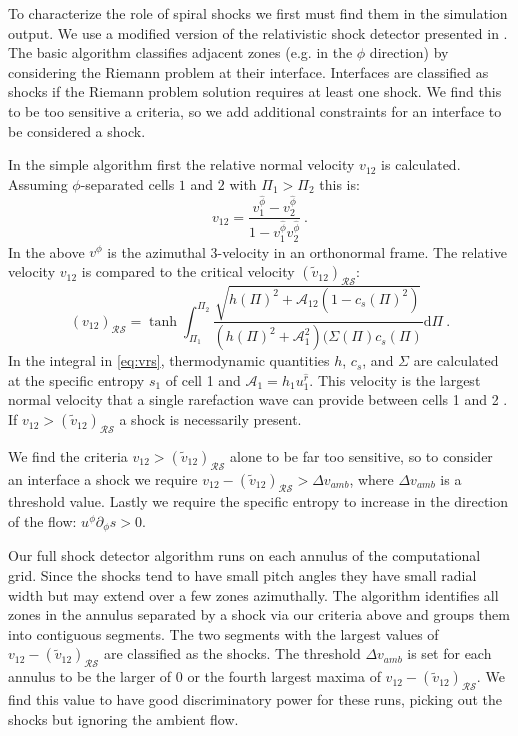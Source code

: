 \documentclass{emulateapj}
\newcommand{\Sig}{\Sigma}
\newcommand{\dd}{\mbox{d}}
\begin{document}
To characterize the role of spiral shocks we first must find them in the simulation output.  We use a modified version of the relativistic shock detector presented in \citep{Zanotti10}.  The basic algorithm classifies adjacent zones (e.g. in the $\phi$ direction) by considering the Riemann problem at their interface.  Interfaces are classified as shocks if the Riemann problem solution requires at least one shock.  We find this to be too sensitive a criteria, so we add additional constraints for an interface to be considered a shock.

In the simple algorithm first the relative normal velocity $v_{12}$ is calculated.  Assuming $\phi$-separated cells $1$ and $2$ with $\Pi_1 > \Pi_2$ this is:
\begin{equation}
	v_{12} = \frac{v^{\hat{\phi}}_1 - v^{\hat{\phi}}_2}{1 - v^{\hat{\phi}}_1 v^{\hat{\phi}}_2} \ . \label{eq:vrel}
\end{equation}
In the above $v^{\hat{\phi}}$ is the azimuthal 3-velocity in an orthonormal frame. The relative velocity $v_{12}$ is compared to the critical velocity $(\tilde{v}_{12})_{\mathcal{R} \mathcal{S}}$:
\begin{equation}
	(v_{12})_{\mathcal{R}\mathcal{S}} = \tanh \int_{\Pi_1}^{\Pi_2} \frac{\sqrt{h(\Pi)^2 + \mathcal{A}_12(1-c_s(\Pi)^2)}}{(h(\Pi)^2 + \mathcal{A}_1^2)(\Sig(\Pi) c_s(\Pi)} \dd \Pi \ . \label{eq:vrs}
\end{equation}  
In the integral in \eqref{eq:vrs}, thermodynamic quantities $h$, $c_s$, and $\Sig$ are calculated at the specific entropy $s_1$ of cell 1 and $\mathcal{A}_1 = h_1 u_1^{\hat{r}}$.  This velocity is the largest normal velocity that a single rarefaction wave can provide between cells 1 and 2    \citep{Rezzolla03}.  If $v_{12} > (\tilde{v}_{12})_{\mathcal{R}\mathcal{S}}$ a shock is necessarily present.

We find the criteria $v_{12} > (\tilde{v}_{12})_{\mathcal{R}\mathcal{S}}$ alone to be far too sensitive, so to consider an interface a shock we require $v_{12} - (\tilde{v}_{12})_{\mathcal{R}\mathcal{S}} > \Delta v_{amb}$, where $\Delta v_{amb}$ is a threshold value.  Lastly we require the specific entropy to increase in the direction of the flow: $u^\phi \partial_\phi s > 0$.

Our full shock detector algorithm runs on each annulus of the computational grid.  Since the shocks tend to have small pitch angles they have small radial width but may extend over a few zones azimuthally.  The algorithm identifies all zones in the annulus separated by a shock via our criteria above and groups them into contiguous segments.  The two segments with the largest values of $v_{12} -  (\tilde{v}_{12})_{\mathcal{R}\mathcal{S}} $ are classified as the shocks. The threshold $\Delta v_{amb}$ is set for each annulus to be the larger of $0$ or the fourth largest maxima of $v_{12} -  (\tilde{v}_{12})_{\mathcal{R}\mathcal{S}} $. We find this value to have good discriminatory power for these runs, picking out the shocks but ignoring the ambient flow.
\end{document}
